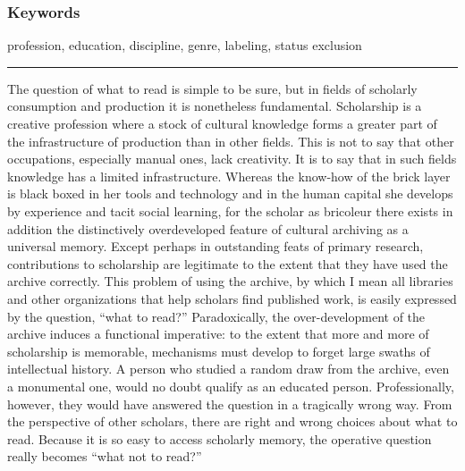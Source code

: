 \documentclass[]{book}
\theoremstyle{definition}
\theoremstyle{definition}
\theoremstyle{definition}
\theoremstyle{remark}
\begin{document}
\hypertarget{keywords}{%
\subsubsection*{Keywords}\label{keywords}}


profession, education, discipline, genre, labeling, status
exclusion

\begin{center}\rule{0.5\linewidth}{\linethickness}\end{center}

The question of what to read is simple to be sure, but in fields of
scholarly consumption and production it is nonetheless fundamental.
Scholarship is a creative profession where a stock of cultural knowledge
forms a greater part of the infrastructure of production than in other
fields. This is not to say that other occupations, especially manual
ones, lack creativity. It is to say that in such fields knowledge has a
limited infrastructure. Whereas the know-how of the brick layer is black
boxed in her tools and technology and in the human capital she develops
by experience and tacit social learning, for the scholar as bricoleur
there exists in addition the distinctively overdeveloped feature of
cultural archiving as a universal memory. Except perhaps in outstanding
feats of primary research, contributions to scholarship are legitimate
to the extent that they have used the archive correctly. This problem of
using the archive, by which I mean all libraries and other organizations
that help scholars find published work, is easily expressed by the
question, ``what to read?'' Paradoxically, the over-development of the
archive induces a functional imperative: to the extent that more and
more of scholarship is memorable, mechanisms must develop to forget
large swaths of intellectual history. A person who studied a random draw
from the archive, even a monumental one, would no doubt qualify as an
educated person. Professionally, however, they would have answered the
question in a tragically wrong way. From the perspective of other
scholars, there are right and wrong choices about what to read. Because
it is so easy to access scholarly memory, the operative question really
becomes ``what not to read?''
\end{document}
